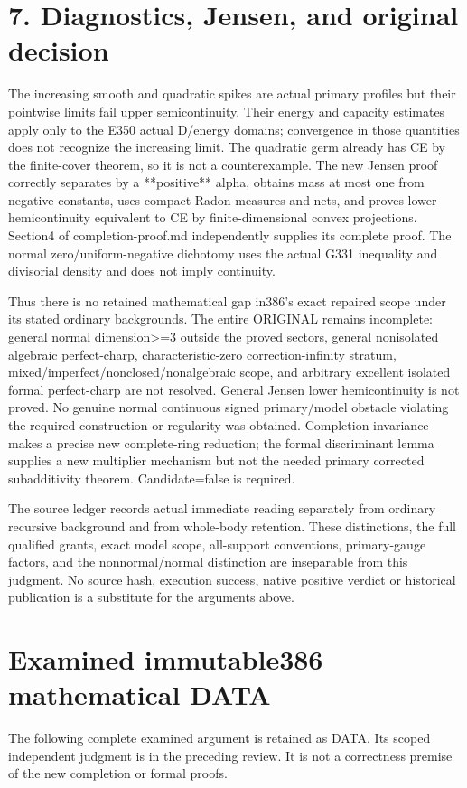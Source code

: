 \documentclass[11pt]{article}
\begin{document}
\section{7. Diagnostics, Jensen, and original decision}

The increasing smooth and quadratic spikes are actual primary profiles but their pointwise limits fail upper semicontinuity. Their energy and capacity estimates apply only to the E350 actual D/energy domains; convergence in those quantities does not recognize the increasing limit. The quadratic germ already has CE by the finite-cover theorem, so it is not a counterexample. The new Jensen proof correctly separates by a **positive** alpha, obtains mass at most one from negative constants, uses compact Radon measures and nets, and proves lower hemicontinuity equivalent to CE by finite-dimensional convex projections. Section4 of completion-proof.md independently supplies its complete proof. The normal zero/uniform-negative dichotomy uses the actual G331 inequality and divisorial density and does not imply continuity.

Thus there is no retained mathematical gap in386's exact repaired scope under its stated ordinary backgrounds. The entire ORIGINAL remains incomplete: general normal dimension>=3 outside the proved sectors, general nonisolated algebraic perfect-charp, characteristic-zero correction-infinity stratum, mixed/imperfect/nonclosed/nonalgebraic scope, and arbitrary excellent isolated formal perfect-charp are not resolved. General Jensen lower hemicontinuity is not proved. No genuine normal continuous signed primary/model obstacle violating the required construction or regularity was obtained. Completion invariance makes a precise new complete-ring reduction; the formal discriminant lemma supplies a new multiplier mechanism but not the needed primary corrected subadditivity theorem. Candidate=false is required.

The source ledger records actual immediate reading separately from ordinary recursive background and from whole-body retention. These distinctions, the full qualified grants, exact model scope, all-support conventions, primary-gauge factors, and the nonnormal/normal distinction are inseparable from this judgment. No source hash, execution success, native positive verdict or historical publication is a substitute for the arguments above.
\appendix
\section{Examined immutable386 mathematical DATA}
The following complete examined argument is retained as DATA. Its scoped independent judgment is in the preceding review. It is not a correctness premise of the new completion or formal proofs.
\end{document}

